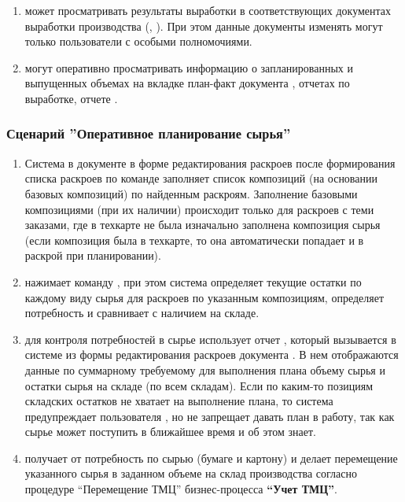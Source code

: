 \begin{enumerate}


\item \planner может просматривать результаты выработки в соответствующих документах выработки производства (, ). При этом данные документы изменять могут только пользователи с особыми полномочиями.
\item \manager могут оперативно просматривать информацию о запланированных и выпущенных объемах на вкладке план-факт документа , отчетах по выработке, отчете .
\end{enumerate}



\subsubsection{Сценарий ''Оперативное планирование сырья''}
\label{bp:plan_7}


\begin{enumerate}


\item	Система \gofro в документе  в форме редактирования раскроев после формирования списка раскроев \planner по команде  заполняет список композиций (на основании базовых композиций)  по найденным раскроям. Заполнение базовыми композициями (при их наличии) происходит только для раскроев с теми заказами, где в техкарте не была изначально заполнена композиция сырья (если композиция была в техкарте, то она автоматически попадает и в раскрой при планировании). 
\item \planner нажимает команду , при этом система \gofro определяет текущие остатки по каждому виду сырья для раскроев по указанным композициям, определяет потребность и сравнивает с наличием на складе.
\item \planner для контроля потребностей в сырье использует отчет , который вызывается в системе \gofro из формы редактирования раскроев документа . В нем отображаются данные по суммарному требуемому для выполнения плана объему сырья и остатки сырья на складе (по всем складам). Если по каким-то позициям складских остатков не хватает на выполнение плана, то система \gofro предупреждает пользователя \planner, но не запрещает давать план в работу, так как сырье может поступить в ближайшее время и \planner об этом знает.
\item \kladovshik 
получает от \planner потребность по сырью (бумаге и картону) и делает перемещение указанного сырья в заданном объеме на склад производства согласно процедуре “Перемещение ТМЦ” бизнес-процесса \textbf{“Учет ТМЦ”}. 
\end{enumerate}


